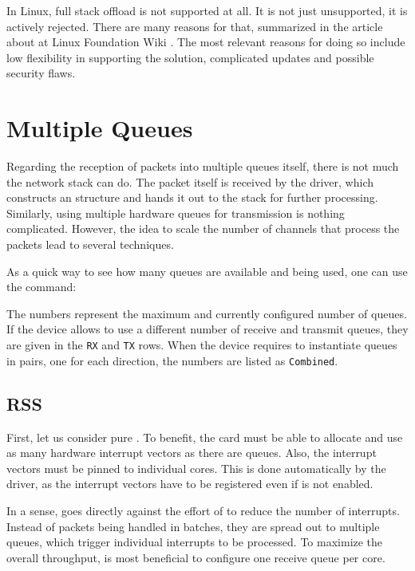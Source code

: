In Linux, full  stack offload is not supported at all. It is not just
unsupported, it is actively rejected. There are many reasons for that,
summarized in the article about  at Linux Foundation Wiki \cite{lf-toe}.
The most relevant reasons for doing so include low flexibility in supporting
the solution, complicated updates and possible security flaws.

\section{Multiple Queues}

Regarding the reception of packets into multiple queues itself, there is not much
the network stack can do. The packet itself is received by the  driver,
which constructs an \skb{} structure and hands it out to the stack for further
processing. Similarly, using multiple hardware queues for transmission is
nothing complicated. However, the idea to scale the number of channels that
process the packets lead to several techniques.

As a quick way to see how many queues are available and  being used, one can
use the  command:


The numbers represent the maximum and currently configured number of queues. If the
device allows to use a different number of receive and transmit queues, they
are given in the \texttt{RX} and \texttt{TX} rows. When the device requires
to instantiate queues in pairs, one for each direction, the numbers are listed as
\texttt{Combined}.

\subsection{\acrlong{RSS}}

First, let us consider pure . To benefit, the card must
be able to allocate and use as many hardware interrupt vectors as there are queues. Also,
the interrupt vectors must be pinned to individual  cores. This is done
automatically by the  driver, as the interrupt vectors have to be
registered even if  is not enabled.

In a sense,  goes directly against the effort of  to reduce the number of
interrupts. Instead of packets being handled in batches, they are spread out to
multiple queues, which trigger individual interrupts to be processed.
To maximize the overall throughput, is most beneficial to configure one receive queue
per  core.

